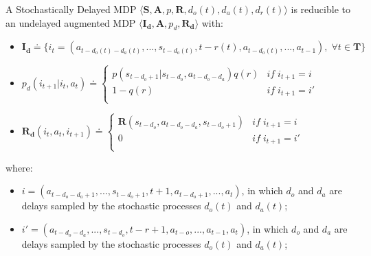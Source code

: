                 \begin{theorem}
                    \label{th:sdmdpred}
                    A Stochastically Delayed MDP $\langle \mathbf{S}, \mathbf{A}, p, \mathbf{R}, d_o(t), d_a(t), d_r(t) \rangle$ is reducible to an undelayed augmented MDP $\langle \mathbf{I_d}, \mathbf{A}, p_d, \mathbf{R_d} \rangle$ with: 
                    \begin{itemize}[topsep=0.5em, partopsep=0.5em]
                        \setlength\itemsep{0em}
                        \item $\mathbf{I_{d}} \doteq \Big\{ i_t = \left( a_{t-d_{o}(t)-d_{a}(t)}, ..., s_{t-d_{o}(t)}, t-r(t), a_{t-d_{o}(t)}, ..., a_{t-1} \right), \; \forall t \in \mathbf{T} \Big\}$
                        \item $p_d \left( i_{t+1} | i_t, a_t \right) \doteq  
                                    \begin{cases} 
                                        p \left( s_{t-d_o+1} | s_{t-d_o}, a_{t-d_o-d_a} \right) q\left(r\right) & if \; i_{t+1} = i \\
                                        1 - q\left(r\right) & if \; i_{t+1} = i'\\
                                    \end{cases}$
                        \item $\mathbf{R_d} \left( i_t, a_t, i_{t+1} \right) \doteq  
                                    \begin{cases} 
                                        \mathbf{R} \left( s_{t-d_o}, a_{t-d_o-d_a}, s_{t-d_o+1} \right) & if \; i_{t+1} = i \\
                                        0 & if \; i_{t+1} = i'\\ 
                                    \end{cases}$
                    \end{itemize}
                    where:
                    \begin{itemize}[topsep=0.5em, partopsep=0.5em]
                        \setlength\itemsep{0em}
                        \item $i = \left( a_{t-d_{o}-d_{a}+1}, ..., s_{t-d_o+1}, t+1, a_{t-d_o+1}, ..., a_{t}\right)$, in which $d_o$ and $d_a$ are delays sampled by the stochastic processes $d_o(t)$ and $d_a(t)$;
                        \item $i' = \left( a_{t-d_{o}-d_{a}}, ..., s_{t-d_o}, t-r+1, a_{t-o}, ..., a_{t-1}, a_{t} \right)$, in which $d_o$ and $d_a$ are delays sampled by the stochastic processes $d_o(t)$ and $d_a(t)$;
                    \end{itemize}
                \end{theorem}
        

